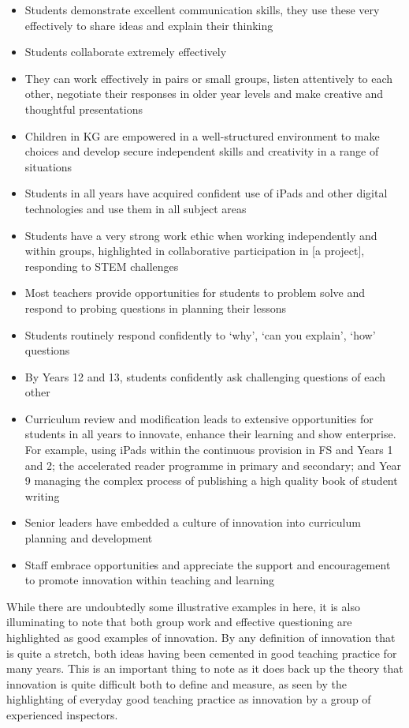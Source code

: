 \documentclass[11pt]{article}
\begin{document}
\begin{itemize}
	\item Students demonstrate excellent communication skills, they use these very effectively to share ideas and explain their thinking
	\item Students collaborate extremely effectively
	\item They can work effectively in pairs or small groups, listen attentively to each other, negotiate their responses in older year levels and make creative and thoughtful presentations
	\item Children in KG are empowered in a well-structured environment to make choices and develop secure independent skills and creativity in a range of situations
	\item Students in all years have acquired confident use of iPads and other digital technologies and use them in all subject areas
	\item Students have a very strong work ethic when working independently and within groups, highlighted in collaborative participation in [a project], responding to STEM challenges
	\item Most teachers provide opportunities for students to problem solve and respond to probing questions in planning their lessons
	\item Students routinely respond confidently to `why', `can you explain', `how' questions
	\item By Years 12 and 13, students confidently ask challenging questions of each other
	\item Curriculum review and modification leads to extensive opportunities for students in all years to innovate, enhance their learning and show enterprise. For example, using iPads within the continuous provision in FS and Years 1 and 2; the accelerated reader programme in primary and secondary; and Year 9 managing the complex process of publishing a high quality book of student writing
	\item Senior leaders have embedded a culture of innovation into curriculum planning and development
	\item Staff embrace opportunities and appreciate the support and encouragement to promote innovation within teaching and learning
\end{itemize}

While there are undoubtedly some illustrative examples in here, it is also illuminating to note that both group work and effective questioning are highlighted as good examples of innovation. By any definition of innovation that is quite a stretch, both ideas having been cemented in good teaching practice for many years. This is an important thing to note as it does back up the theory that innovation is quite difficult both to define and measure, as seen by the highlighting of everyday good teaching practice as innovation by a group of experienced inspectors.
\end{document}
